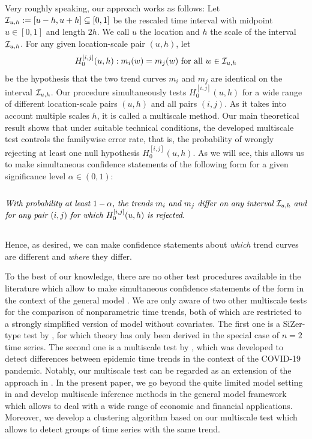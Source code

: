\documentclass[12pt]{article}
\makeatletter
\renewcommand{\eqref}[1]{\tagform@{\ref{#1}}}
\makeatother
\begin{document}
Very roughly speaking, our approach works as follows: Let $\mathcal{I}_{u, h} := [u-h,u+h] \subseteq [0,1]$ be the rescaled time interval with midpoint $u \in [0,1]$ and length $2h$. We call $u$ the location and $h$ the scale of the interval $\mathcal{I}_{u, h}$. For any given location-scale pair $(u,h)$, let
\[ H_0^{[i, j]}(u, h): m_i(w) = m_j(w) \text{ for all } w \in \mathcal{I}_{u, h} \] 
be the hypothesis that the two trend curves $m_i$ and $m_j$ are identical on the interval $\mathcal{I}_{u, h}$. Our procedure simultaneously tests $H_0^{[i, j]}(u, h)$ for a wide range of different location-scale pairs $(u,h)$ and all pairs $(i,j)$. As it takes into account multiple scales $h$, it is called a multiscale method. Our main theoretical result shows that under suitable technical conditions, the developed multiscale test controls the familywise error rate, that is, the probability of wrongly rejecting at least one null hypothesis $H_0^{[i, j]}(u, h)$. As we will see, this allows us to make simultaneous confidence statements of the following form for a given significance level $\alpha \in (0,1)$: 
\begin{equation}\label{eq:conf-statement}
\begin{minipage}[c][2cm][c]{13cm}
\textit{With probability at least $1-\alpha$, the trends $m_i$ and $m_j$ differ on any interval $\interval$ and for any pair $(i,j)$ for which $H_0^{[i, j]}(u, h)$ is rejected.} 
\end{minipage}
\end{equation}
Hence, as desired, we can make confidence statements about \textit{which} trend curves are different and \textit{where} they differ.


To the best of our knowledge, there are no other test procedures available in the literature which allow to make simultaneous confidence statements of the form \eqref{eq:conf-statement} in the context of the general model \eqref{eq:model}. We are only aware of two other multiscale tests for the comparison of nonparametric time trends, both of which are restricted to a strongly simplified version of model \eqref{eq:model} without covariates. The first one is a SiZer-type test by \cite{Park2009}, for which theory has only been derived in the special case of $n=2$ time series. The second one is a multiscale test by \cite{KhismatullinaVogt2021}, which was developed to detect differences between epidemic time trends in the context of the COVID-19 pandemic. Notably, our multiscale test can be regarded as an extension of the approach in \cite{KhismatullinaVogt2021}. In the present paper, we go beyond the quite limited model setting in \cite{KhismatullinaVogt2021} and develop multiscale inference methods in the general model framework \eqref{eq:model} which allows to deal with a wide range of economic and financial applications. Moreover, we develop a clustering algorithm based on our multiscale test which allows to detect groups of time series with the same trend. 
\end{document}
